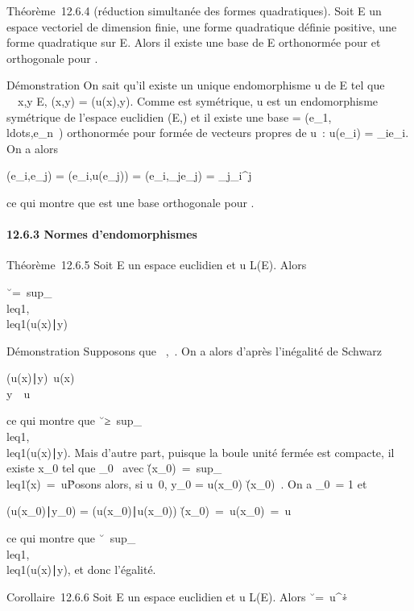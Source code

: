 \documentclass[]{article}
\begin{document}
Théorème~12.6.4 (réduction simultanée des formes quadratiques). Soit E
un ~ espace vectoriel de dimension finie, \Phi une forme quadratique
définie positive, \Psi une forme quadratique sur E. Alors il existe une
base  de E orthonormée pour \Phi et orthogonale pour \Psi.

Démonstration On sait qu'il existe un unique endomorphisme u de E tel
que \forall~~x,y \in E, \psi(x,y) = \phi(u(x),y). Comme \psi est
symétrique, u est un endomorphisme symétrique de l'espace euclidien
(E,\Phi) et il existe une base  =
(e_1,\\ldots,e_n~)
orthonormée pour \Phi formée de vecteurs propres de u~: u(e_i) =
\lambda_ie_i. On a alors

\psi(e_i,e_j) = \phi(e_i,u(e_j)) =
\phi(e_i,\lambda_je_j) =
\lambda_j\delta_i^j

ce qui montre que  est une base orthogonale pour \psi.

\paragraph{12.6.3 Normes d'endomorphismes}

Théorème~12.6.5 Soit E un espace euclidien et u \in L(E). Alors

\u\
=\
sup_\x\\leq1,\y\(u(x)∣y)

Démonstration Supposons que
\x\ \leq
1,\y\ \leq 1. On a alors
d'après l'inégalité de Schwarz

(u(x)∣y)\leq\
u(x)\\y\
\leq\ u\

ce qui montre que \u\
≥\
sup_\x\\leq1,\y\\leq1(u(x)∣y).
Mais d'autre part, puisque la boule unité fermée est compacte, il existe
x_0 tel que
\x_0\ 
avec \u(x_0)\
=\
sup_\x\\leq1\u(x)\
=\ u\. Posons alors,
si u\neq~0, y_0 = u(x_0)
\over
\u(x_0)\ .
On a \y_0\ =
1 et

(u(x_0)∣y_0)
= (u(x_0)∣u(x_0))
\over
\u(x_0)\
=\ u(x_0)\
=\ u\

ce qui montre que \u\
\leq\
sup_\x\\leq1,\y\\leq1(u(x)∣y),
et donc l'égalité.

Corollaire~12.6.6 Soit E un espace euclidien et u \in L(E). Alors
\u\
=\ u^∗\.
\end{document}
